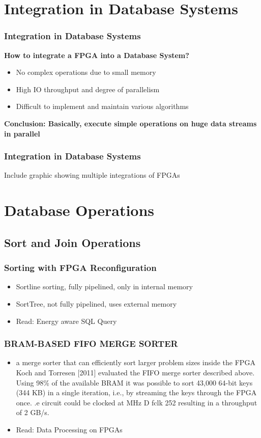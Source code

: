\documentclass{beamer}
\begin{document}
\section{Integration in Database Systems}
\begin{frame}
	\frametitle{Integration in Database Systems}
	
	\textbf{How to integrate a FPGA into a Database System?}
	\begin{itemize}
		\item No complex operations due to small memory
		\item High IO throughput and degree of parallelism
		\item Difficult to implement and maintain various algorithms
	\end{itemize}
	\vspace*{1cm}
	\textbf{Conclusion: Basically, execute simple operations on huge data streams in parallel}
\end{frame}

\begin{frame}
\frametitle{Integration in Database Systems}
Include graphic showing multiple integrations of FPGAs
\end{frame}

\section{Database Operations}

\subsection{Sort and Join Operations}
\begin{frame}
	\frametitle{Sorting with FPGA Reconfiguration}
	\begin{itemize}
		\item Sortline sorting, fully pipelined, only in internal memory
		\item SortTree, not fully pipelined, uses external memory
		\item Read: Energy aware SQL Query
	\end{itemize}
\end{frame}

\begin{frame}
\frametitle{BRAM-BASED FIFO MERGE SORTER}
\begin{itemize}
	\item a merge sorter that can efficiently sort larger problem sizes inside the FPGA
	Koch and Torresen [2011] evaluated the FIFO merge sorter described above. Using 98\% of the available BRAM it was possible to sort 43,000 64-bit keys (344 KB) in a single iteration, i.e., by streaming the keys through the FPGA once. .e circuit could be clocked at MHz D fclk 252 resulting in a throughput of 2 GB/s.
	\item Read: Data Processing on FPGAs
\end{itemize}
\end{frame}
\end{document}
